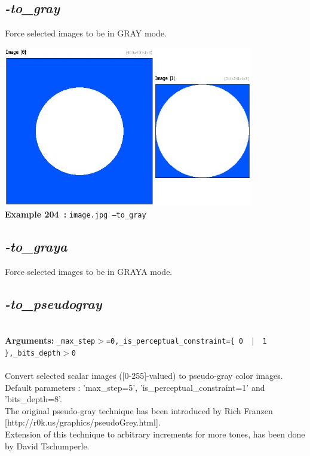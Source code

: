 \documentclass[a4paper,11pt,twoside]{book}
\begin{document}
\subsection{\emph{-to\_gray} }\vspace*{-0.5em}
Force selected images to be in GRAY mode.
\begin{center}\includegraphics[keepaspectratio=true,height=7cm,width=\textwidth]{img/gmic_def204.jpg}\\
{\footnotesize \textbf{Example 204~:} \texttt{image.jpg --to\_gray}}
\end{center}

\subsection{\emph{-to\_graya} }\vspace*{-0.5em}
Force selected images to be in GRAYA mode.


\subsection{\emph{-to\_pseudogray} }\vspace*{-0.5em}
~\\\textbf{Arguments: } 
{\small \texttt{\_max\_step$>$=0,\_is\_perceptual\_constraint=\{ 0 ~$|$~ 1 \},\_bits\_depth$>$0}}\\~\\
Convert selected scalar images ([0-255]-valued) to pseudo-gray color images.
~\\Default parameters : 'max\_step=5', 'is\_perceptual\_constraint=1' and 'bits\_depth=8'.
~\\The original pseudo-gray technique has been introduced by Rich Franzen [http://r0k.us/graphics/pseudoGrey.html].
~\\Extension of this technique to arbitrary increments for more tones, has been done by David Tschumperle.
\end{document}
